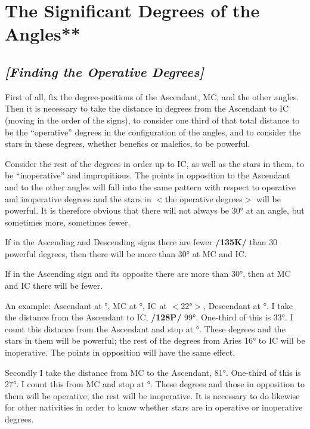 \section{The Significant Degrees of the Angles**}

\subsection{\textit{[Finding the Operative Degrees]}}
First of all, fix the degree-positions of the Ascendant, MC, and the other angles. Then it is necessary to take the distance in degrees from the Ascendant to IC (moving in the order of the signs), to consider one third of that total distance to be the “operative” degrees in the configuration of the angles, and to consider the stars in these degrees, whether benefics or malefics, to be powerful. 

Consider the rest of the degrees in order up to IC, as well as the stars in them, to be “inoperative” and impropitious. The points in opposition to the Ascendant and to the other angles will fall into the same pattern with respect to operative
and inoperative degrees and the stars in $<$the operative degrees$>$ will be powerful. It is therefore obvious that there will not always be 30° at an angle, but sometimes more, sometimes fewer. 

If in the Ascending and Descending signs there are fewer \textbf{/135K/} than 30 powerful degrees, then there will be more than 30° at MC and IC. 

If in the Ascending sign and its opposite there are more than 30°, then at MC and IC there will be fewer.

An example: Ascendant at \Pisces\xspace 13°, MC at \Sagittarius\xspace 22°, IC at \Gemini $<$22°$>$, Descendant at
\Virgo\xspace 13°. I take the distance from the Ascendant to IC, \textbf{/128P/} 99°. One-third of this is 33°. I count this
distance from the Ascendant and stop at \Aries\xspace 16°. These degrees and the stars in them will be powerful; the rest of the degrees from Aries 16° to IC will be inoperative. The points in opposition will have the same effect. 

Secondly I take the distance from MC to the Ascendant, 81°. One-third of this is 27°. I count this from MC and stop at \Capricorn\xspace 19°. These degrees and those in opposition to them will be operative; the rest will be inoperative. It is necessary to do likewise for other nativities in order to know whether stars are in operative or inoperative degrees.

